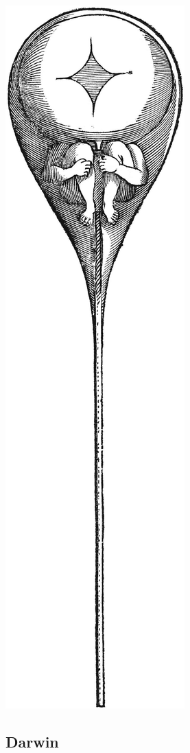 \documentclass[
]{book}
\begin{document}
\includegraphics[width=0.5\linewidth]{figs/introduction/homunculus}

\hypertarget{darwin}{%
\subsection{Darwin}\label{darwin}}
\end{document}
